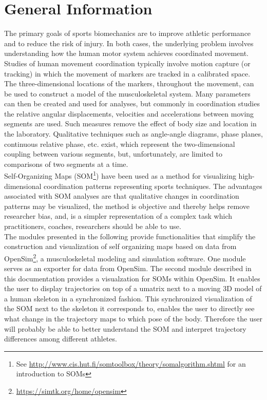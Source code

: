 \documentclass[a4paper]{scrartcl}
\begin{document}
\tableofcontents
\newpage

\section{General Information}
The primary goals of sports biomechanics are to improve athletic performance and to reduce the risk of injury.
In both cases, the underlying problem involves understanding how the human motor system achieves coordinated movement.
Studies of human movement coordination typically involve motion capture (or tracking) in which the movement of markers are tracked in a calibrated space.
The three-dimensional locations of the markers, throughout the movement, can be used to construct a model of the musculoskeletal system.
Many parameters can then be created and used for analyses, but commonly in coordination studies the relative angular displacements, velocities and accelerations between moving segments are used.
Such measures remove the effect of body size and location in the laboratory.
Qualitative techniques such as angle-angle diagrams, phase planes, continuous relative phase, etc. exist, which represent the two-dimensional coupling between various segments, but, unfortunately, are limited to comparisons of two segments at a time.\\
Self-Organizing Maps (SOM\footnote{See \href{http://www.cis.hut.fi/somtoolbox/theory/somalgorithm.shtml}{http://www.cis.hut.fi/somtoolbox/theory/somalgorithm.shtml} for an introduction to SOMs}) have been used as a method for visualizing high-dimensional coordination patterns representing sports techniques.
The advantages associated with SOM analyses are that qualitative changes in coordination patterns may be visualized, the method is objective and thereby helps remove researcher bias, and, is a simpler representation of a complex task which practitioners, coaches, researchers should be able to use.\\
The modules presented in the following provide functionalities that simplify the construction and visualization of self organizing maps based on data from OpenSim\footnote{\href{https://simtk.org/home/opensim}{https://simtk.org/home/opensim}}, a musculoskeletal modeling and simulation software. One module serves as an exporter for data from OpenSim. The second module described in this documentation provides a visualzation for SOMs within OpenSim. It enables the user to display trajectories on top of a umatrix next to a moving 3D model of a human skeleton in a synchronized fashion. This synchronized visualization of the SOM next to the skeleton it corresponds to, enables the user to directly see what change in the trajectory maps to which pose of the body. Therefore the user will probably be able to better understand the SOM and interpret trajectory differences among different athletes.
\end{document}
